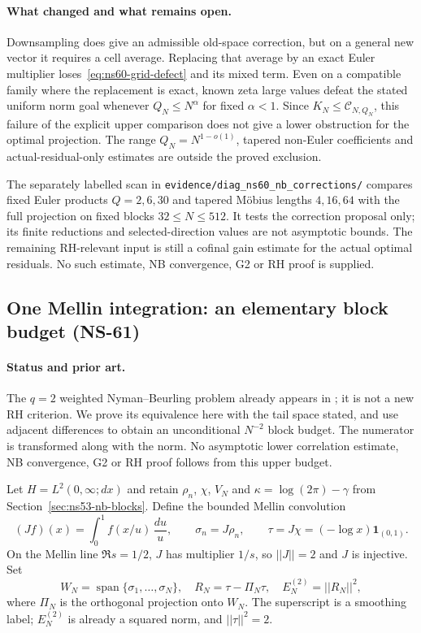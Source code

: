 \documentclass[11pt]{article}
\def\norm#1{||#1||}%
\theoremstyle{remark}
\newcommand{\norm}[1]{\left\lVert #1\right\rVert}
\begin{document}
\paragraph{What changed and what remains open.}
Downsampling does give an admissible old-space correction, but on a
general new vector it requires a cell average. Replacing that average
by an exact Euler multiplier loses~\eqref{eq:ns60-grid-defect} and its
mixed term. Even on a compatible family where the replacement is exact,
known zeta large values defeat the stated uniform norm goal whenever
$Q_N\leq N^\alpha$ for fixed $\alpha<1$.
Since $K_N\leq\mathcal C_{N,Q_N}$, this failure of the explicit upper
comparison does not give a lower obstruction for the optimal projection.
The range $Q_N=N^{1-o(1)}$, tapered non-Euler coefficients and
actual-residual-only estimates are outside the proved exclusion.

The separately labelled scan in
\texttt{evidence/diag\_ns60\_nb\_corrections/} compares fixed Euler
products $Q=2,6,30$ and tapered M\"obius lengths $4,16,64$ with the full
projection on fixed blocks $32\leq N\leq512$. It tests the correction
proposal only; its finite reductions and selected-direction values are
not asymptotic bounds. The remaining RH-relevant input is still a
cofinal gain estimate for the actual optimal residuals. No such estimate,
NB convergence, G2 or RH proof is supplied.

\subsection{One Mellin integration: an elementary block budget (NS-61)}
\label{sec:ns61-smoothed-nb}

\paragraph{Status and prior art.}
The $q=2$ weighted Nyman--Beurling problem already appears in
\cite{Ehm2024}; it is not a new RH criterion. We prove its equivalence
here with the tail space stated, and use adjacent differences to obtain
an unconditional $N^{-2}$ block budget. The numerator is transformed
along with the norm. No asymptotic lower correlation estimate, NB
convergence, G2 or RH proof follows from this upper budget.

Let $H=L^2(0,\infty;dx)$ and retain $\rho_n$, $\chi$, $V_N$ and
$\kappa=\log(2\pi)-\gamma$ from Section~\ref{sec:ns53-nb-blocks}.
Define the bounded Mellin convolution
\[
 (Jf)(x)=\int_0^1f(x/u)\,\frac{du}{u},\qquad
 \sigma_n=J\rho_n,\qquad \tau=J\chi=(-\log x)\mathbf1_{(0,1)}.
\]
On the Mellin line $\Re s=1/2$, $J$ has multiplier $1/s$, so
$\norm J=2$ and $J$ is injective. Set
\[
 W_N=\operatorname{span}\{\sigma_1,\ldots,\sigma_N\},\quad
 R_N=\tau-\Pi_N\tau,\quad E_N^{(2)}=\norm{R_N}^2,
\]
where $\Pi_N$ is the orthogonal projection onto $W_N$.
The superscript is a smoothing label; $E_N^{(2)}$ is already a
squared norm, and $\norm\tau^2=2$.
\end{document}

